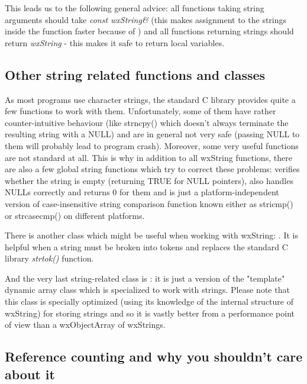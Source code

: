 This leads us to the following general advice: all functions taking string
arguments should take {\it const wxString\&} (this makes assignment to the
strings inside the function faster because of 
) and all functions returning
strings should return {\it wxString} - this makes it safe to return local
variables.

\subsection{Other string related functions and classes}

As most programs use character strings, the standard C library provides quite a
few functions to work with them. Unfortunately, some of them have rather
counter-intuitive behaviour (like strncpy() which doesn't always terminate the resulting
string with a NULL) and are in general not very safe (passing NULL to them will
probably lead to program crash). Moreover, some very useful functions are not
standard at all. This is why in addition to all wxString functions, there are
also a few global string functions which try to correct these problems: 
 verifies whether the string is empty (returning
TRUE for NULL pointers),  also handles NULLs correctly
and returns 0 for them and  is just a
platform-independent version of case-insensitive string comparison function
known either as stricmp() or strcasecmp() on different platforms.

There is another class which might be useful when working with wxString: 
. It is helpful when a string must
be broken into tokens and replaces the standard C library {\it
strtok()} function.

And the very last string-related class is : it
is just a version of the "template" dynamic array class which is specialized to work
with strings. Please note that this class is specially optimized (using its
knowledge of the internal structure of wxString) for storing strings and so it is
vastly better from a performance point of view than a wxObjectArray of wxStrings.

\subsection{Reference counting and why you shouldn't care about it}\label{wxstringrefcount}

